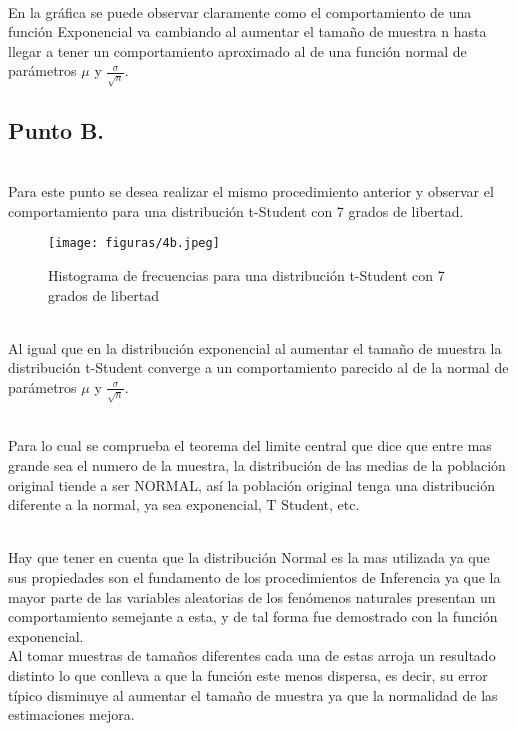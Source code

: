 \documentclass[letterpaper,12pt,onecolumn,titlepage]{article}
\begin{document}
~\\En la gr\'{a}fica se puede observar claramente como el comportamiento de una funci\'{o}n Exponencial va cambiando al aumentar el tama\~{n}o de muestra n hasta llegar a tener un comportamiento aproximado al de una funci\'{o}n normal de par\'{a}metros $\mu$ y $\frac{\sigma}{\sqrt{n}}$. 

\pagebreak\subsection{Punto B.}
~\\ Para este punto se desea realizar el mismo procedimiento anterior y observar el comportamiento para una distribuci\'{o}n t-Student con 7 grados de libertad.
\begin{figure}[!h]
    \begin{center}
        \texttt{[image: figuras/4b.jpeg]}
        \caption{Histograma de frecuencias para una distribuci\'{o}n t-Student con 7 grados de libertad}
        \label{fig:Densidad}
    \end{center}
\end{figure}

~\\Al igual que en la distribuci\'{o}n exponencial al aumentar el tama\~{n}o de muestra la distribuci\'{o}n t-Student converge a un comportamiento parecido al de la normal de par\'{a}metros $\mu$ y $\frac{\sigma}{\sqrt{n}}$. 

~\\Para lo cual se comprueba el teorema del limite central que dice que entre mas grande sea el numero de la muestra, la distribuci\'{o}n de las medias de la poblaci\'{o}n original tiende a ser NORMAL, as\'{i} la poblaci\'{o}n original tenga una distribuci\'{o}n diferente a la normal, ya sea exponencial, T Student, etc.

~\\Hay que tener en cuenta que la distribuci\'{o}n Normal es la mas utilizada ya que sus propiedades
son el fundamento de los procedimientos de Inferencia ya que la mayor parte
de las variables aleatorias de los fen\'{o}menos naturales presentan un comportamiento semejante a esta, y de tal forma fue demostrado con la funci\'{o}n exponencial.
~\\Al tomar muestras de tama\~{n}os diferentes cada una de estas arroja un resultado distinto lo que conlleva a que la funci\'{o}n este menos dispersa, es decir, su error t\'{i}pico disminuye al aumentar el tama\~{n}o de muestra ya que la normalidad de las estimaciones mejora.
\end{document}
